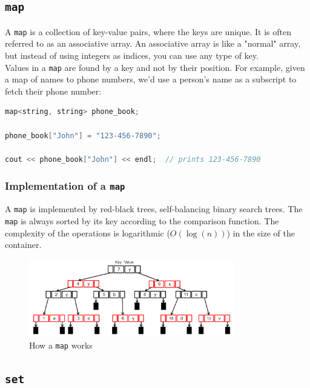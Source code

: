 \subsection{\texttt{map}}

A \texttt{map} is a collection of key-value pairs, where the keys are unique. It is often referred
to as an associative array. An associative array is like a "normal" array, but instead of using
integers as indices, you can use any type of key.\\

Values in a \texttt{map} are found by a key and not by their position. For example, given a map
of names to phone numbers, we'd use a person's name as a subscript to fetch their phone number:\\

\begin{lstlisting}[language=C++]
map<string, string> phone_book;

phone_book["John"] = "123-456-7890";

cout << phone_book["John"] << endl;  // prints 123-456-7890
\end{lstlisting}

\subsubsection{Implementation of a \texttt{map}}

A \texttt{map} is implemented by red-black trees, self-balancing binary search trees. The
\texttt{map} is always sorted by its key according to the comparison function. The complexity
of the operations is logarithmic ($O(\log(n))$) in the size of the container.

\begin{figure}[H]
    \centering
    \includegraphics[width=0.8\textwidth]{figures/map.png}
    \caption{How a \texttt{map} works}
    \label{fig:map}
\end{figure}

\subsection{\texttt{set}}

